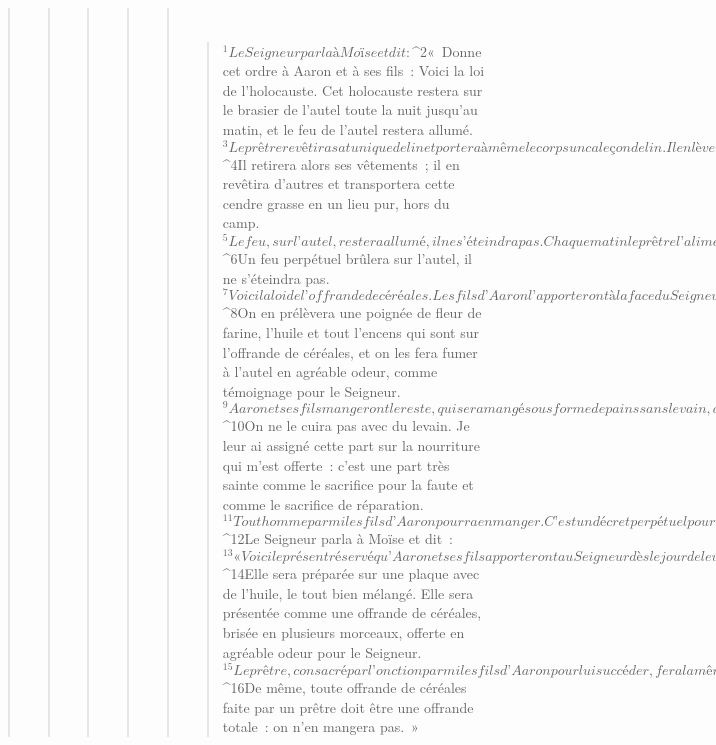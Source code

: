 \begin{verse}
\begin{verse}
\begin{verse}
\begin{verse}
\begin{verse}
         
      \bchapter{}
      \begin{verse}
${}^{1}Le Seigneur parla à Moïse et dit : 
${}^{2}« Donne cet ordre à Aaron et à ses fils : Voici la loi de l’holocauste. Cet holocauste restera sur le brasier de l’autel toute la nuit jusqu’au matin, et le feu de l’autel restera allumé. 
${}^{3}Le prêtre revêtira sa tunique de lin et portera à même le corps un caleçon de lin. Il enlèvera la cendre grasse, résidu de l’holocauste consumé par le feu sur l’autel, et la déposera à côté de l’autel. 
${}^{4}Il retirera alors ses vêtements ; il en revêtira d’autres et transportera cette cendre grasse en un lieu pur, hors du camp. 
${}^{5}Le feu, sur l’autel, restera allumé, il ne s’éteindra pas. Chaque matin le prêtre l’alimentera en bois. Il y disposera l’holocauste et y fera fumer les graisses des sacrifices de paix. 
${}^{6}Un feu perpétuel brûlera sur l’autel, il ne s’éteindra pas.
${}^{7}Voici la loi de l’offrande de céréales. Les fils d’Aaron l’apporteront à la face du Seigneur, devant l’autel. 
${}^{8}On en prélèvera une poignée de fleur de farine, l’huile et tout l’encens qui sont sur l’offrande de céréales, et on les fera fumer à l’autel en agréable odeur, comme témoignage pour le Seigneur. 
${}^{9}Aaron et ses fils mangeront le reste, qui sera mangé sous forme de pains sans levain, dans un lieu saint ; ils le mangeront dans la cour de la tente de la Rencontre. 
${}^{10}On ne le cuira pas avec du levain. Je leur ai assigné cette part sur la nourriture qui m’est offerte : c’est une part très sainte comme le sacrifice pour la faute et comme le sacrifice de réparation. 
${}^{11}Tout homme parmi les fils d’Aaron pourra en manger. C’est un décret perpétuel pour toutes vos générations, concernant les nourritures offertes au Seigneur. Quiconque y touchera sera sanctifié. »
${}^{12}Le Seigneur parla à Moïse et dit : 
${}^{13}« Voici le présent réservé qu’Aaron et ses fils apporteront au Seigneur dès le jour de leur onction : un dixième de mesure de fleur de farine comme offrande perpétuelle, moitié le matin, moitié le soir. 
${}^{14}Elle sera préparée sur une plaque avec de l’huile, le tout bien mélangé. Elle sera présentée comme une offrande de céréales, brisée en plusieurs morceaux, offerte en agréable odeur pour le Seigneur. 
${}^{15}Le prêtre, consacré par l’onction parmi les fils d’Aaron pour lui succéder, fera la même chose. C’est un décret perpétuel. Cette offrande partira totalement en fumée vers le Seigneur. 
${}^{16}De même, toute offrande de céréales faite par un prêtre doit être une offrande totale : on n’en mangera pas. »

\end{verse}
\end{verse}
\end{verse}
\end{verse}
\end{verse}
\end{verse}

